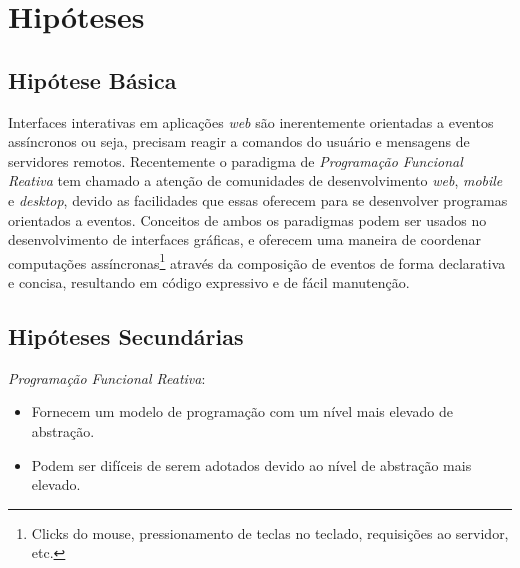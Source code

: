 \section{Hipóteses}\label{lhipoteses}


\subsection{Hipótese Básica}

Interfaces interativas em aplicações \textit{web}
são inerentemente orientadas a eventos assíncronos
ou seja, precisam reagir a comandos do usuário e
mensagens de servidores remotos.
Recentemente o paradigma de \textit{Programação Funcional Reativa}
tem chamado a atenção de
comunidades de desenvolvimento \textit{web}, \textit{mobile}
e \textit{desktop}, devido as facilidades que essas
oferecem para se desenvolver programas orientados a eventos.
Conceitos de ambos os paradigmas podem ser usados
no desenvolvimento de interfaces gráficas,
e oferecem uma maneira de coordenar
computações assíncronas\footnote{
  Clicks do mouse, pressionamento de teclas no teclado,
  requisições ao servidor, etc.
}
através da composição de eventos de forma declarativa
e concisa, resultando em código expressivo e de fácil
manutenção.


\subsection{Hipóteses Secundárias}

\textit{Programação Funcional Reativa}:
\begin{itemize}[noitemsep]
  \item Fornecem um modelo de programação com um nível mais elevado
        de abstração.
  \item Podem ser difíceis de serem adotados devido ao nível de abstração
        mais elevado.
\end{itemize}

